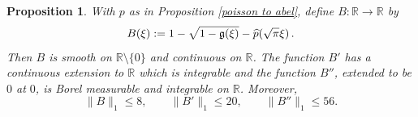 \documentclass[12pt,reqno]{amsart}
\theoremstyle{plain}
\newtheorem{proposition}[theorem]{Proposition}
\numberwithin{equation}{section}
\theoremstyle{remark}
\newcommand{\R}{{\mathbb R}}
\begin{document}
\begin{proposition}\label{auxiliary function B}
    With $p$ as in Proposition \ref{poisson to abel}, define $B:\R\to \R$ by
\begin{equation}\label{auto:Gaussian-square-root-remainder}
    B(\xi):=1-\sqrt{1-\mathfrak{g}(\xi)}-\widehat{p}(\sqrt{\pi}\xi)\, .
\end{equation}
Then $B$ is smooth on $\R\setminus \{0\}$ and continuous on $\R$. The function $B'$
has a continuous extension to $\R$ which is integrable and the
function $B''$, extended to be $0$ at $0$, is Borel measurable and integrable on $\R$.
Moreover,
\begin{equation}\label{eq:B-explicit-norms}
    \|B\|_1\le 8,\qquad
    \|B'\|_1\le 20,\qquad
    \|B''\|_1\le 56.
\end{equation}
\end{proposition}
\end{document}
